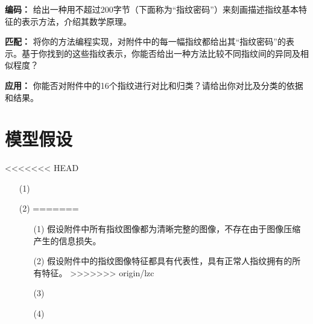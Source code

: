 \documentclass{whutmod}
\begin{document}
			\textbf{编码：} 给出一种用不超过200字节（下面称为“指纹密码”）来刻画描述指纹基本特征的表示方法，介绍其数学原理。
			
			\textbf{匹配：} 将你的方法编程实现，对附件中的每一幅指纹都给出其“指纹密码”的表示。基于你找到的这些指纹表示，你能否给出一种方法比较不同指纹间的异同及相似程度？
			
			\textbf{应用：} 你能否对附件中的16个指纹进行对比和归类？请给出你对比及分类的依据和结果。

	\section{模型假设}
<<<<<<< HEAD
		\begin{itemize}                                             
		\item [(1)]
		\item [(2)]
=======
		\begin{itemize}    
	\item [(1)] 假设附件中所有指纹图像都为清晰完整的图像，不存在由于图像压缩产生的信息损失。
\item [(2)] 假设附件中的指纹图像特征都具有代表性，具有正常人指纹拥有的所有特征。
>>>>>>> origin/lzc
		\item [(3)] 
		\item [(4)] 
		\end{itemize}


\end{itemize}
\end{document}
